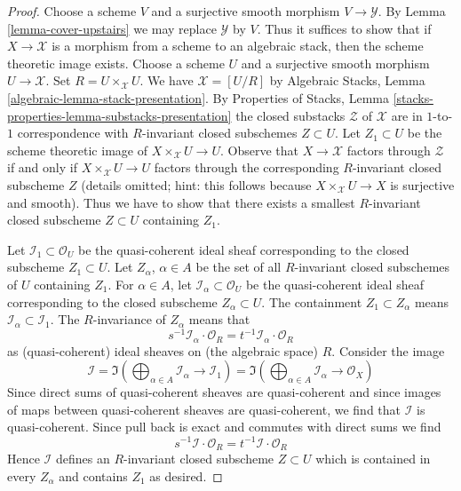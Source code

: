 \begin{proof}
Choose a scheme $V$ and a surjective smooth morphism $V \to \mathcal{Y}$.
By Lemma \ref{lemma-cover-upstairs} we may replace $\mathcal{Y}$ by $V$.
Thus it suffices to show that if $X \to \mathcal{X}$ is a morphism from
a scheme to an algebraic stack, then the scheme theoretic image exists.
Choose a scheme $U$ and a surjective smooth morphism $U \to \mathcal{X}$.
Set $R = U \times_\mathcal{X} U$.
We have $\mathcal{X} = [U/R]$ by
Algebraic Stacks, Lemma \ref{algebraic-lemma-stack-presentation}.
By Properties of Stacks, Lemma
\ref{stacks-properties-lemma-substacks-presentation}
the closed substacks $\mathcal{Z}$ of $\mathcal{X}$
are in $1$-to-$1$ correspondence with $R$-invariant
closed subschemes $Z \subset U$.
Let $Z_1 \subset U$ be the scheme theoretic image of
$X \times_\mathcal{X} U \to U$.
Observe that $X \to \mathcal{X}$ factors through $\mathcal{Z}$
if and only if $X \times_\mathcal{X} U \to U$ factors through
the corresponding $R$-invariant closed subscheme $Z$
(details omitted; hint: this follows because
$X \times_\mathcal{X} U \to X$ is surjective and smooth).
Thus we have to show that there exists a smallest $R$-invariant
closed subscheme $Z \subset U$ containing $Z_1$.

\medskip\noindent
Let $\mathcal{I}_1 \subset \mathcal{O}_U$ be the quasi-coherent
ideal sheaf corresponding to the closed subscheme $Z_1 \subset U$.
Let $Z_\alpha$, $\alpha \in A$ be the set of all $R$-invariant
closed subschemes of $U$ containing $Z_1$.
For $\alpha \in A$, let $\mathcal{I}_\alpha \subset \mathcal{O}_U$
be the quasi-coherent ideal sheaf corresponding to the closed subscheme
$Z_\alpha \subset U$. The containment $Z_1 \subset Z_\alpha$
means $\mathcal{I}_\alpha \subset \mathcal{I}_1$.
The $R$-invariance of $Z_\alpha$ means that
$$
s^{-1}\mathcal{I}_\alpha \cdot \mathcal{O}_R =
t^{-1}\mathcal{I}_\alpha \cdot \mathcal{O}_R
$$
as (quasi-coherent) ideal sheaves on (the algebraic space) $R$.
Consider the image
$$
\mathcal{I} =
\Im\left(
\bigoplus\nolimits_{\alpha \in A} \mathcal{I}_\alpha \to \mathcal{I}_1
\right) =
\Im\left(
\bigoplus\nolimits_{\alpha \in A} \mathcal{I}_\alpha \to \mathcal{O}_X
\right)
$$
Since direct sums of quasi-coherent sheaves are quasi-coherent
and since images of maps between quasi-coherent sheaves are
quasi-coherent, we find that $\mathcal{I}$ is quasi-coherent.
Since pull back is exact and commutes with direct sums we find
$$
s^{-1}\mathcal{I} \cdot \mathcal{O}_R =
t^{-1}\mathcal{I} \cdot \mathcal{O}_R
$$
Hence $\mathcal{I}$ defines an $R$-invariant closed subscheme
$Z \subset U$ which is contained in every $Z_\alpha$ and contains
$Z_1$ as desired.
\end{proof}

